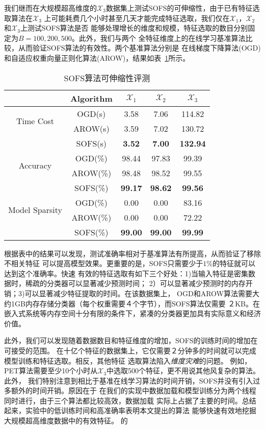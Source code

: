\documentclass[doctor]{ustcthesis}
\def \X {\mathcal{X}}
\begin{document}
我们继而在大规模超高维度的$\X_3$数据集上测试SOFS的可伸缩性，由于已有特征选取算法在$\X_3$
上可能耗费几个小时甚至几天才能完成特征选取，我们仅在$\X_1$，$\X_2$和$\X_3$上测试SOFS算法是否
能够处理增长的维度和规模，特征选取的数目分别固定为$B=100,200,500$。此外，我们与两个
全特征维度上的在线学习基准算法比较，从而验证SOFS算法的有效性。两个基准算法分别是
在线梯度下降算法(OGD)和自适应权重向量正则化算法(AROW)，结果如表~\ref{tab:sofs-scalability}所示。
\begin{table}[htbp]
\caption{SOFS算法可伸缩性评测}
\label{tab:sofs-scalability}
\begin{center}
    \begin{tabular}{|c|c|c|c|c|}
        \hline
        & Algorithm & $\X_1$ & $\X_2$ & $\X_3$  \\
        \hline
        \multirow{2}{*}{Time Cost} & OGD(s) & 3.58 & 7.06 & 114.82 \\
        & AROW(s) & 3.59 & 7.02 & 130.72 \\
        & SOFS(s) & \textbf{3.52} & \textbf{7.00} & \textbf{132.94} \\
        \hline
        \multirow{2}{*}{Accuracy} & OGD(\%) & 98.44 & 97.83 & 99.39 \\
        & AROW(\%) & 98.48 & 98.52 & 99.55 \\
        & SOFS(\%) & \textbf{99.17} & \textbf{98.62} & \textbf{99.56} \\
        \hline
        \multirow{2}{*}{Model Sparsity} & OGD(\%) & 0.00 & 0.00 & 83.16 \\
        & AROW(\%) & 0.00 & 0.00 & 72.22 \\
        & SOFS(\%) & \textbf{99.00} & \textbf{99.00} & \textbf{99.99} \\
        \hline
    \end{tabular}
\end{center}
\end{table}
根据表中的结果可以发现，测试准确率相对于基准算法有所提高，从而验证了移除不相关特征
可以提高模型效果。更重要的是，SOFS只需要少于$1\%$的特征就可以达到这个准确率。快速
有效的特征选取有如下三个好处：1)当输入特征是密集数据时，稀疏的分类器可以显著减少预测时间；
2）可以显著减少预测时的内存开销；3)可以显著减少特征提取的时间。在该数据集上，
OGD和AROW算法需要大约1GB内存存储分类器（每个权重需要４个字节），而SOFS算法仅需要
２KB。在嵌入式系统等内存空间十分有限的条件下，紧凑的分类器更加具有实际意义和经济价值。

此外，我们可以发现随着数据数目和特征维度的增加，SOFS的训练时间的增加在可接受的范围。
在十亿个特征的数据集上，它仅需要２分钟多的时间就可以完成模型训练和特征选取。相反，其他特征
选取算法陷入\emph{维度灾难}的问题。
例如，PET算法需要至少10个小时从$\X_3$中选取500个特征，更不用说其他风复杂的算法。此外，
我们特别注意到相比于基准在线学习算法的时间开销，SOFS并没有引入过多额外的时间开销。原因在于
在我们的实现中数据加载和模型训练分为两个线程同时进行，由于三个算法都比较高效，数据加载
实际上占据了主要的时间。总结起来，实验中的低训练时间和高准确率表明本文提出的算法
能够快速有效地挖掘大规模超高维度数据中的有效特征。
的
\end{document}
